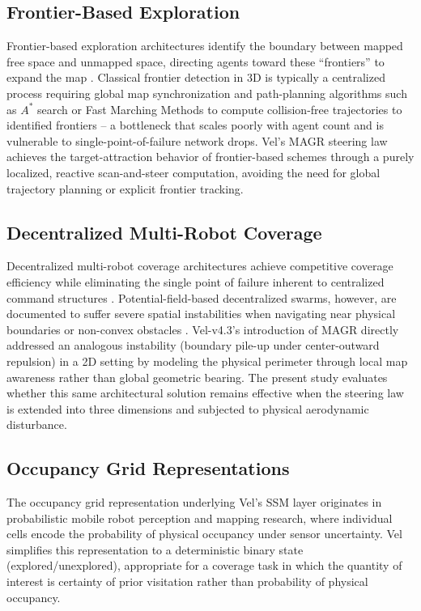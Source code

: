 \documentclass[10pt,journal]{IEEEtran}
\begin{document}
\subsection{Frontier-Based Exploration}
Frontier-based exploration architectures identify the boundary between
mapped free space and unmapped space, directing agents toward these
``frontiers'' to expand the map \cite{yamauchi1997}. Classical frontier
detection in 3D is typically a centralized process requiring global map
synchronization and path-planning algorithms such as $A^*$ search or Fast
Marching Methods to compute collision-free trajectories to identified
frontiers -- a bottleneck that scales poorly with agent count and is
vulnerable to single-point-of-failure network drops. Vel's MAGR steering
law achieves the target-attraction behavior of frontier-based schemes
through a purely localized, reactive scan-and-steer computation, avoiding
the need for global trajectory planning or explicit frontier tracking.

\subsection{Decentralized Multi-Robot Coverage}
Decentralized multi-robot coverage architectures achieve competitive
coverage efficiency while eliminating the single point of failure inherent
to centralized command structures \cite{brambilla2013review}.
Potential-field-based decentralized swarms, however, are documented to
suffer severe spatial instabilities when navigating near physical
boundaries or non-convex obstacles \cite{saska2014cooperative}. Vel-v4.3's
introduction of MAGR directly addressed an analogous instability (boundary
pile-up under center-outward repulsion) in a 2D setting by modeling the
physical perimeter through local map awareness rather than global geometric
bearing. The present study evaluates whether this same architectural
solution remains effective when the steering law is extended into three
dimensions and subjected to physical aerodynamic disturbance.

\subsection{Occupancy Grid Representations}
The occupancy grid representation underlying Vel's SSM layer originates in
probabilistic mobile robot perception and mapping research, where
individual cells encode the probability of physical occupancy under sensor
uncertainty. Vel simplifies this representation to a deterministic binary
state (explored/unexplored), appropriate for a coverage task in which the
quantity of interest is certainty of prior visitation rather than
probability of physical occupancy.
\end{document}
